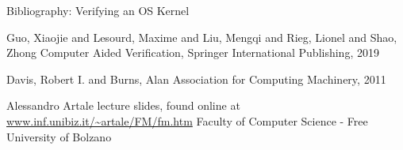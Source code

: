 \documentclass{beamer}
\begin{document}
	 \begin{frame}{Bibliography: Verifying an OS Kernel}
	 	\begin{thebibliography}{10}
	   	 \beamertemplatebookbibitems	
	      	
	 Guo, Xiaojie and Lesourd, Maxime and Liu, Mengqi and Rieg, Lionel and Shao, Zhong 
	 	\newblock {}
	 	\newblock Computer Aided Verification, Springer International Publishing, 2019	
	 
	 Davis, Robert I. and Burns, Alan
	 \newblock {}
	 \newblock Association for Computing Machinery, 2011	 
 	 \end{thebibliography}
  	\end{frame}
	
	
\begin{frame}
   \begin{thebibliography}{10}
     	 \beamertemplatebookbibitems
     	 
     	 Alessandro Artale
     	 \newblock {}
     	 \newblock lecture slides, found online at \url{www.inf.unibiz.it/~artale/FM/fm.htm}
     	 \newblock Faculty of Computer Science - Free University of Bolzano
	\end{thebibliography}
\end{frame}
	 
	
	 
		
		
	
\end{document}
